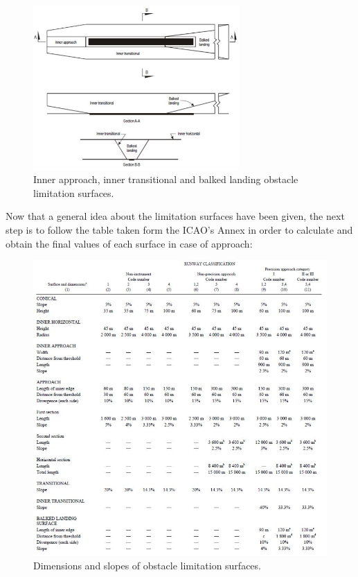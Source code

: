 	 \begin{figure}[H]
	 	\centering
	 	\includegraphics[clip, trim=0cm 0cm 0cm 0cm, width=0.7\textwidth]{./images/servidumbres/servidumbres2}
	 	\caption{Inner approach, inner transitional and balked landing obstacle limitation surfaces.}
	 	\label{}
	 \end{figure}
	
	Now that a general idea about the limitation surfaces have been given, the next step is to follow the table taken form the ICAO's Annex in order to calculate and obtain the final values of each surface in case of approach:
	
	\begin{figure}[H]
		\centering
		\includegraphics[clip, trim=0cm 0cm 0cm 0cm, width=1\textwidth]{./images/servidumbres/taula}
		\caption{Dimensions and slopes of obstacle limitation surfaces.}
		\label{}
	\end{figure}

